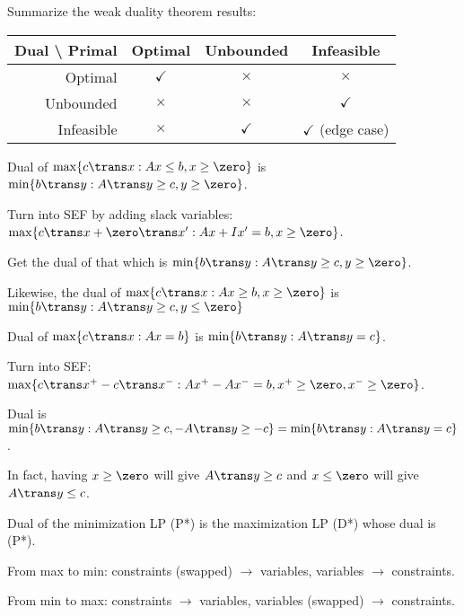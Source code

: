 
Summarize the weak duality theorem results:
\begin{center}
  \begin{tabular}{rccc}
    Dual \textbackslash{} Primal & Optimal      & Unbounded    & Infeasible               \\ \hline
    Optimal                      & $\checkmark$ & $\times$     & $\times$                 \\
    Unbounded                    & $\times$     & $\times$     & $\checkmark$             \\
    Infeasible                   & $\times$     & $\checkmark$ & $\checkmark$ (edge case) \\
  \end{tabular}
\end{center}

\begin{prop}
  Dual of $\max\{c\trans x : Ax \leq b, x \geq \zero\}$
  is $\min\{b\trans y : A\trans y \geq c, y \geq \zero\}$.
\end{prop}
\begin{prf}
  Turn into SEF by adding slack variables:
  $\max\{c\trans x + \zero\trans x' : Ax + Ix' = b, x \geq \zero\}$.

  Get the dual of that which is
  $\min\{b\trans y : A\trans y \geq c, y \geq \zero\}$.

  Likewise, the dual of $\max\{c\trans x : Ax \geq b, x \geq \zero\}$
  is $\min\{b\trans y : A\trans y \geq c, y \leq \zero\}$
\end{prf}

\begin{prop}
  Dual of $\max\{c\trans x : Ax = b\}$ is $\min\{b\trans y : A\trans y = c\}$.
\end{prop}
\begin{prf}
  Turn into SEF:
  $\max \{c\trans x^+ - c\trans x^- : Ax^+ - Ax^- = b, x^+ \geq \zero, x^- \geq \zero\}$.

  Dual is
  $\min\{b\trans y : A\trans y \geq c, -A\trans y \geq -c\}
    = \min\{b\trans y : A\trans y = c\}$.

  In fact, having $x \geq \zero$ will give $A\trans y \geq c$ and
  $x \leq \zero$ will give $A\trans y \leq c$.
\end{prf}

\begin{prop}
  Dual of the minimization LP (P*) is the maximization LP (D*) whose dual is (P*).
\end{prop}
\begin{prf}
  From max to min: constraints (swapped) $\to$ variables, variables $\to$ constraints.

  From min to max: constraints $\to$ variables, variables (swapped) $\to$ constraints.
\end{prf}


